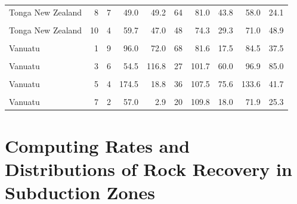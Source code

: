\begin{ThreePartTable}
\begin{longtable}[t]{lrrrrrrrrr}
Tonga New Zealand & 8 & 7 & 49.0 & 49.2 & 64 & 81.0 & 43.8 & 58.0 & 24.1\\
\cellcolor{gray!6}{Tonga New Zealand} & \cellcolor{gray!6}{9} & \cellcolor{gray!6}{4} & \cellcolor{gray!6}{31.1} & \cellcolor{gray!6}{23.2} & \cellcolor{gray!6}{58} & \cellcolor{gray!6}{73.8} & \cellcolor{gray!6}{34.8} & \cellcolor{gray!6}{53.1} & \cellcolor{gray!6}{46.2}\\
Tonga New Zealand & 10 & 4 & 59.7 & 47.0 & 48 & 74.3 & 29.3 & 71.0 & 48.9\\
\cellcolor{gray!6}{Tonga New Zealand} & \cellcolor{gray!6}{11} & \cellcolor{gray!6}{5} & \cellcolor{gray!6}{31.8} & \cellcolor{gray!6}{19.7} & \cellcolor{gray!6}{52} & \cellcolor{gray!6}{79.3} & \cellcolor{gray!6}{33.4} & \cellcolor{gray!6}{53.8} & \cellcolor{gray!6}{41.1}\\
Vanuatu & 1 & 9 & 96.0 & 72.0 & 68 & 81.6 & 17.5 & 84.5 & 37.5\\
\cellcolor{gray!6}{Vanuatu} & \cellcolor{gray!6}{2} & \cellcolor{gray!6}{4} & \cellcolor{gray!6}{91.4} & \cellcolor{gray!6}{32.7} & \cellcolor{gray!6}{44} & \cellcolor{gray!6}{103.0} & \cellcolor{gray!6}{51.3} & \cellcolor{gray!6}{79.8} & \cellcolor{gray!6}{49.8}\\
Vanuatu & 3 & 6 & 54.5 & 116.8 & 27 & 101.7 & 60.0 & 96.9 & 85.0\\
\cellcolor{gray!6}{Vanuatu} & \cellcolor{gray!6}{4} & \cellcolor{gray!6}{3} & \cellcolor{gray!6}{125.0} & \cellcolor{gray!6}{9.5} & \cellcolor{gray!6}{34} & \cellcolor{gray!6}{110.8} & \cellcolor{gray!6}{67.7} & \cellcolor{gray!6}{119.4} & \cellcolor{gray!6}{87.2}\\
Vanuatu & 5 & 4 & 174.5 & 18.8 & 36 & 107.5 & 75.6 & 133.6 & 41.7\\
\cellcolor{gray!6}{Vanuatu} & \cellcolor{gray!6}{6} & \cellcolor{gray!6}{2} & \cellcolor{gray!6}{123.0} & \cellcolor{gray!6}{18.0} & \cellcolor{gray!6}{30} & \cellcolor{gray!6}{118.1} & \cellcolor{gray!6}{48.1} & \cellcolor{gray!6}{110.0} & \cellcolor{gray!6}{29.8}\\
Vanuatu & 7 & 2 & 57.0 & 2.9 & 20 & 109.8 & 18.0 & 71.9 & 25.3\\*
\end{longtable}
\end{ThreePartTable}
\endgroup{}

\endgroup

\cleardoublepage


\hypertarget{computing-rates-and-distributions-of-rock-recovery-in-subduction-zones}{%
\chapter{Computing Rates and Distributions of Rock Recovery in Subduction Zones}\label{computing-rates-and-distributions-of-rock-recovery-in-subduction-zones}}

